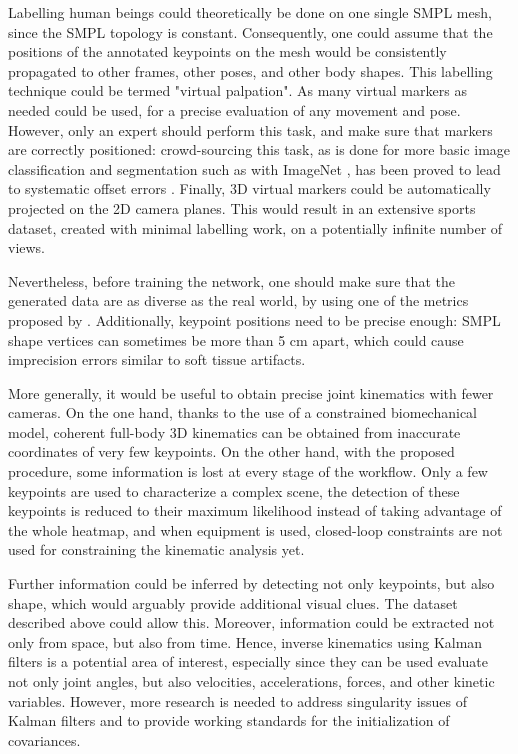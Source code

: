 Labelling human beings could theoretically be done on one single SMPL mesh, since the SMPL topology is constant. Consequently, one could assume that the positions of the annotated keypoints on the mesh would be consistently propagated to other frames, other poses, and other body shapes. This labelling technique could be termed "virtual palpation". As many virtual markers as needed could be used, for a precise evaluation of any movement and pose. However, only an expert should perform this task, and make sure that markers are correctly positioned: crowd-sourcing this task, as is done for more basic image classification and segmentation such as with ImageNet \cite{Deng2009}, has been proved to lead to systematic offset errors \cite{Needham2021b}. Finally, 3D virtual markers could be automatically projected on the 2D camera planes. This would result in an extensive sports dataset, created with minimal labelling work, on a potentially infinite number of views. 

Nevertheless, before training the network, one should make sure that the generated data are as diverse as the real world, by using one of the metrics proposed by \cite{Borji2019, Borji2022}. Additionally, keypoint positions need to be precise enough: SMPL shape vertices can sometimes be more than 5 cm apart, which could cause imprecision errors similar to soft tissue artifacts. 

\vspace*{1.5cm}
More generally, it would be useful to obtain precise joint kinematics with fewer cameras. On the one hand, thanks to the use of a constrained biomechanical model, coherent full-body 3D kinematics can be obtained from inaccurate coordinates of very few keypoints. On the other hand, with the proposed procedure, some information is lost at every stage of the workflow. Only a few keypoints are used to characterize a complex scene, the detection of these keypoints is reduced to their maximum likelihood instead of taking advantage of the whole heatmap, and when equipment is used, closed-loop constraints are not used for constraining the kinematic analysis yet. 

Further information could be inferred by detecting not only keypoints, but also shape, which would arguably provide additional visual clues. The dataset described above could allow this. Moreover, information could be extracted not only from space, but also from time. Hence, inverse kinematics using Kalman filters is a potential area of interest, especially since they can be used evaluate not only joint angles, but also velocities, accelerations, forces, and other kinetic variables. However, more research is needed to address singularity issues of Kalman filters and to provide working standards for the initialization of covariances.


